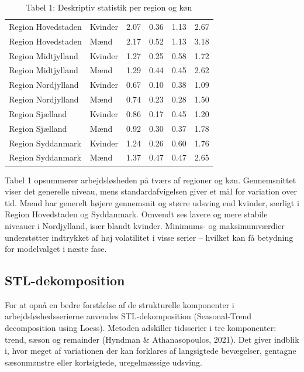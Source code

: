 \documentclass[
]{article}
\begin{document}
\begin{longtable}[t]{llrrrr}
\caption{Tabel 1: Deskriptiv statistik per region og køn}\\
\toprule
\cellcolor[HTML]{f0f0f0}{\textbf{region}} & \cellcolor[HTML]{f0f0f0}{\textbf{kon}} & \cellcolor[HTML]{f0f0f0}{\textbf{Gennemsnit}} & \cellcolor[HTML]{f0f0f0}{\textbf{Standardafvigelse}} & \cellcolor[HTML]{f0f0f0}{\textbf{Minimum}} & \cellcolor[HTML]{f0f0f0}{\textbf{Maksimum}}\\
\midrule
Region Hovedstaden & Kvinder & 2.07 & 0.36 & 1.13 & 2.67\\
Region Hovedstaden & Mænd & 2.17 & 0.52 & 1.13 & 3.18\\
Region Midtjylland & Kvinder & 1.27 & 0.25 & 0.58 & 1.72\\
Region Midtjylland & Mænd & 1.29 & 0.44 & 0.45 & 2.62\\
Region Nordjylland & Kvinder & 0.67 & 0.10 & 0.38 & 1.09\\
\addlinespace
Region Nordjylland & Mænd & 0.74 & 0.23 & 0.28 & 1.50\\
Region Sjælland & Kvinder & 0.86 & 0.17 & 0.45 & 1.20\\
Region Sjælland & Mænd & 0.92 & 0.30 & 0.37 & 1.78\\
Region Syddanmark & Kvinder & 1.24 & 0.26 & 0.60 & 1.76\\
Region Syddanmark & Mænd & 1.37 & 0.47 & 0.47 & 2.65\\
\bottomrule
\end{longtable}

Tabel 1 opsummerer arbejdsløsheden på tværs af regioner og køn.
Gennemsnittet viser det generelle niveau, mens standardafvigelsen giver
et mål for variation over tid. Mænd har generelt højere gennemsnit og
større udsving end kvinder, særligt i Region Hovedstaden og Syddanmark.
Omvendt ses lavere og mere stabile niveauer i Nordjylland, især blandt
kvinder. Minimums- og maksimumværdier understøtter indtrykket af høj
volatilitet i visse serier -- hvilket kan få betydning for modelvalget i
næste fase.

\subsection{STL-dekomposition}\label{stl-dekomposition}

For at opnå en bedre forståelse af de strukturelle komponenter i
arbejdsløshedsserierne anvendes STL-dekomposition (Seasonal-Trend
decomposition using Loess). Metoden adskiller tidsserier i tre
komponenter: trend, sæson og remainder (Hyndman \& Athanasopoulos,
2021). Det giver indblik i, hvor meget af variationen der kan forklares
af langsigtede bevægelser, gentagne sæsonmønstre eller kortsigtede,
uregelmæssige udsving.
\end{document}
